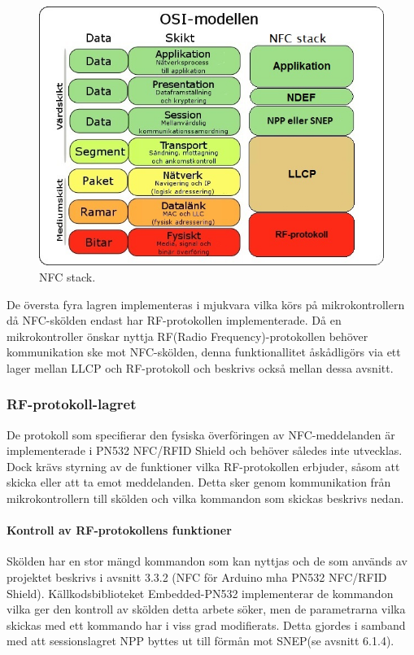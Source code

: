 \documentclass[11pt]{article}
\begin{document}
\begin{figure}[H]
\centering
\includegraphics[scale=0.8]{NFC_stack.jpg}
\caption{NFC stack.}
\label{fig:NFC_stack}
\end{figure}

De översta fyra lagren implementeras i mjukvara vilka körs på mikrokontrollern då NFC-skölden endast har RF-protokollen implementerade. Då en mikrokontroller önskar nyttja RF(Radio Frequency)-protokollen behöver kommunikation ske mot NFC-skölden, denna funktionallitet åskådligörs via ett lager mellan LLCP och RF-protokoll och beskrivs också mellan dessa avsnitt.

\subsubsection{RF-protokoll-lagret}
De protokoll som specifierar den fysiska överföringen av NFC-meddelanden är implementerade i PN532 NFC/RFID Shield och behöver således inte utvecklas. Dock krävs styrning av de funktioner vilka RF-protokollen erbjuder, såsom att skicka eller att ta emot meddelanden. Detta sker genom kommunikation från mikrokontrollern till skölden och vilka kommandon som skickas beskrivs nedan.

\paragraph{Kontroll av RF-protokollens funktioner}
Skölden har en stor mängd kommandon som kan nyttjas och de som används av projektet beskrivs i avsnitt 3.3.2 (NFC för Arduino mha PN532 NFC/RFID Shield). Källkodsbiblioteket Embedded-PN532 implementerar de kommandon vilka ger den kontroll av skölden detta arbete söker, men de parametrarna vilka skickas med ett kommando har i viss grad modifierats. Detta gjordes i samband med att sessionslagret NPP byttes ut till förmån mot SNEP(se avsnitt 6.1.4).
\end{document}
